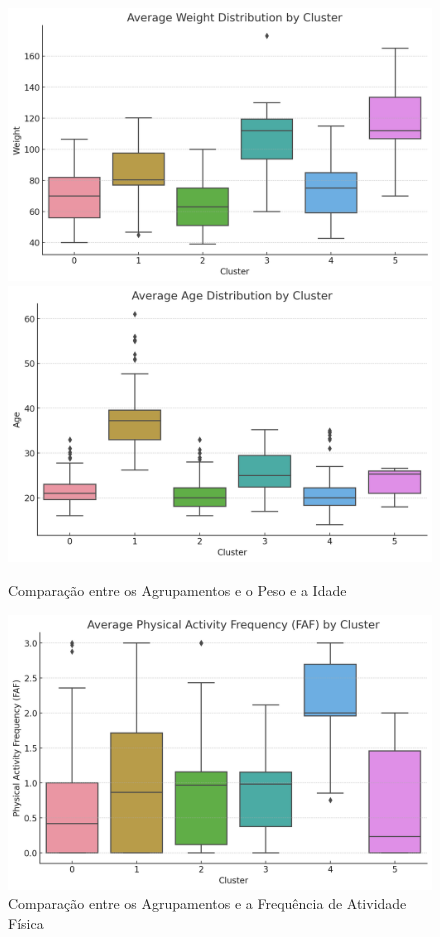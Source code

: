 \documentclass{easychair}
\begin{document}
\begin{figure}[ht]
  \centering
  \begin{minipage} %
    {\linewidth}
    \includegraphics[width=0.5\linewidth]{images/cluster-weight.jpg}
    \includegraphics[width=0.5\linewidth]{images/cluster-age.jpg}
  \end{minipage}
  \caption{Comparação entre os Agrupamentos e o Peso e a Idade}
  \label{fig:cluster-weight-age}

  \centering
  \begin{minipage}
    {\linewidth}
    \includegraphics[width=\linewidth]{images/cluster-faf.jpg}
  \end{minipage}
  \caption{Comparação entre os Agrupamentos e a Frequência de Atividade Física}
  \label{fig:cluster-faf}
\end{figure}
\end{document}
